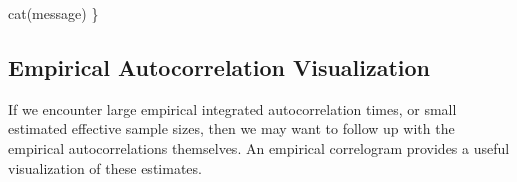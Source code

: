\documentclass[
  letterpaper,
  DIV=11,
  numbers=noendperiod]{scrartcl}
\newenvironment{Shaded}{\begin{snugshade}}{\end{snugshade}}
\newcommand{\FunctionTok}[1]{\textcolor[rgb]{0.28,0.35,0.67}{#1}}
\newcommand{\NormalTok}[1]{\textcolor[rgb]{0.00,0.23,0.31}{#1}}
\begin{document}
\begin{Shaded}
\begin{Highlighting}[]
  \FunctionTok{cat}\NormalTok{(message)}
\NormalTok{\}}
\end{Highlighting}
\end{Shaded}

\hypertarget{empirical-autocorrelation-visualization}{%
\subsection{Empirical Autocorrelation
Visualization}\label{empirical-autocorrelation-visualization}}

If we encounter large empirical integrated autocorrelation times, or
small estimated effective sample sizes, then we may want to follow up
with the empirical autocorrelations themselves. An empirical correlogram
provides a useful visualization of these estimates.
\end{document}
